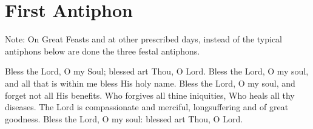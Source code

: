 \section{First Antiphon}

\begin{rubricmed}
    Note: On Great Feasts and at other prescribed days, instead of the typical antiphons below are done the three festal antiphons.
\end{rubricmed}

\begin{hymn}
    Bless the Lord, O my Soul; blessed art Thou, O Lord. Bless the Lord, O my soul, and all that is within me bless His holy name. Bless the Lord, O my soul, and forget not all His benefits. Who forgives all thine iniquities, Who heals all thy diseases. The Lord is compassionate and merciful, longsuffering and of great goodness. Bless the Lord, O my soul: blessed art Thou, O Lord.
\end{hymn}